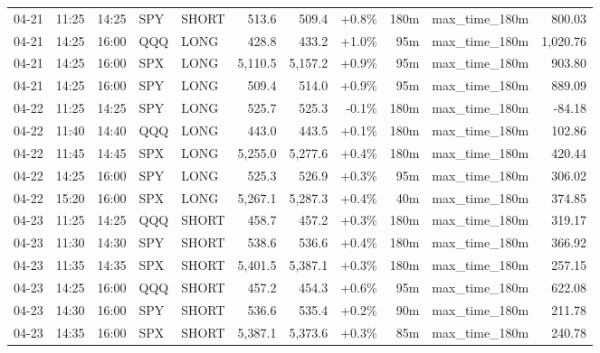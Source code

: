 \documentclass[11pt,a4paper,twoside]{article}
\begin{document}
\begin{center}
\begin{longtable}{>{\color{txtmain}}l l l l l r r r r >{\color{txtmain}}l r}
04-21 & 11:25 & 14:25 & SPY & SHORT & 513.6 & 509.4 & \textcolor{wingreen}{+0.8\%} & 180m & max\_time\_180m & \textcolor{wingreen}{800.03} \\
04-21 & 14:25 & 16:00 & QQQ & LONG & 428.8 & 433.2 & \textcolor{wingreen}{+1.0\%} & 95m & max\_time\_180m & \textcolor{wingreen}{1,020.76} \\
04-21 & 14:25 & 16:00 & SPX & LONG & 5,110.5 & 5,157.2 & \textcolor{wingreen}{+0.9\%} & 95m & max\_time\_180m & \textcolor{wingreen}{903.80} \\
04-21 & 14:25 & 16:00 & SPY & LONG & 509.4 & 514.0 & \textcolor{wingreen}{+0.9\%} & 95m & max\_time\_180m & \textcolor{wingreen}{889.09} \\
04-22 & 11:25 & 14:25 & SPY & LONG & 525.7 & 525.3 & \textcolor{lossred}{-0.1\%} & 180m & max\_time\_180m & \textcolor{lossred}{-84.18} \\
04-22 & 11:40 & 14:40 & QQQ & LONG & 443.0 & 443.5 & \textcolor{wingreen}{+0.1\%} & 180m & max\_time\_180m & \textcolor{wingreen}{102.86} \\
04-22 & 11:45 & 14:45 & SPX & LONG & 5,255.0 & 5,277.6 & \textcolor{wingreen}{+0.4\%} & 180m & max\_time\_180m & \textcolor{wingreen}{420.44} \\
04-22 & 14:25 & 16:00 & SPY & LONG & 525.3 & 526.9 & \textcolor{wingreen}{+0.3\%} & 95m & max\_time\_180m & \textcolor{wingreen}{306.02} \\
04-22 & 15:20 & 16:00 & SPX & LONG & 5,267.1 & 5,287.3 & \textcolor{wingreen}{+0.4\%} & 40m & max\_time\_180m & \textcolor{wingreen}{374.85} \\
04-23 & 11:25 & 14:25 & QQQ & SHORT & 458.7 & 457.2 & \textcolor{wingreen}{+0.3\%} & 180m & max\_time\_180m & \textcolor{wingreen}{319.17} \\
04-23 & 11:30 & 14:30 & SPY & SHORT & 538.6 & 536.6 & \textcolor{wingreen}{+0.4\%} & 180m & max\_time\_180m & \textcolor{wingreen}{366.92} \\
04-23 & 11:35 & 14:35 & SPX & SHORT & 5,401.5 & 5,387.1 & \textcolor{wingreen}{+0.3\%} & 180m & max\_time\_180m & \textcolor{wingreen}{257.15} \\
04-23 & 14:25 & 16:00 & QQQ & SHORT & 457.2 & 454.3 & \textcolor{wingreen}{+0.6\%} & 95m & max\_time\_180m & \textcolor{wingreen}{622.08} \\
04-23 & 14:30 & 16:00 & SPY & SHORT & 536.6 & 535.4 & \textcolor{wingreen}{+0.2\%} & 90m & max\_time\_180m & \textcolor{wingreen}{211.78} \\
04-23 & 14:35 & 16:00 & SPX & SHORT & 5,387.1 & 5,373.6 & \textcolor{wingreen}{+0.3\%} & 85m & max\_time\_180m & \textcolor{wingreen}{240.78} \\

\end{longtable}
\end{center}
\end{document}
